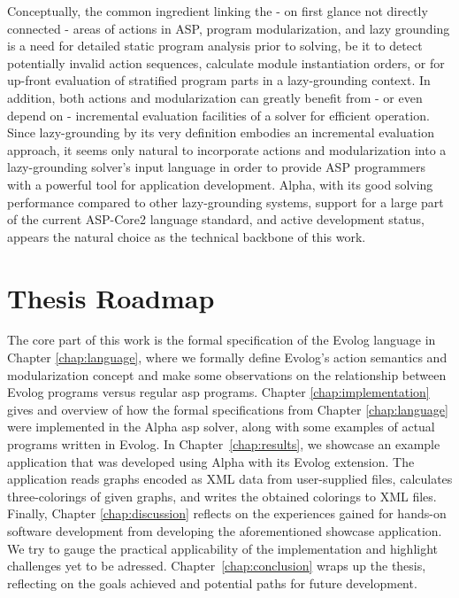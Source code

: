 Conceptually, the common ingredient linking the - on first glance not directly connected - areas of actions in ASP, program modularization, and lazy grounding is a need for detailed static program analysis prior to solving, be it to detect potentially invalid action sequences, calculate module instantiation orders, or for up-front evaluation of stratified program parts in a lazy-grounding context. In addition, both actions and modularization can greatly benefit from - or even depend on - incremental evaluation facilities of a solver for efficient operation. Since lazy-grounding by its very definition embodies an incremental evaluation approach, it seems only natural to incorporate actions and modularization into a lazy-grounding solver's input language in order to provide ASP programmers with a powerful tool for application development. Alpha, with its good solving performance compared to other lazy-grounding systems, support for a large part of the current ASP-Core2 language standard, and active development status, appears the natural choice as the technical backbone of this work.

\section{Thesis Roadmap}
\label{sec:thesis-roadmap}

The core part of this work is the formal specification of the Evolog language in Chapter \ref{chap:language}, where we formally define Evolog's action semantics and modularization concept and make some observations on the relationship between Evolog programs versus regular \gls{asp} programs. Chapter \ref{chap:implementation} gives and overview of how the formal specifications from Chapter \ref{chap:language} were implemented in the Alpha \gls{asp} solver, along with some examples of actual programs written in Evolog. In Chapter~\ref{chap:results}, we showcase an example application that was developed using Alpha with its Evolog extension. The application reads graphs encoded as XML data from user-supplied files, calculates three-colorings of given graphs, and writes the obtained colorings to XML files. Finally, Chapter \ref{chap:discussion} reflects on the experiences gained for hands-on software development from developing the aforementioned showcase application. We try to gauge the practical applicability of the implementation and highlight challenges yet to be adressed. Chapter~\ref{chap:conclusion} wraps up the thesis, reflecting on the goals achieved and potential paths for future development.